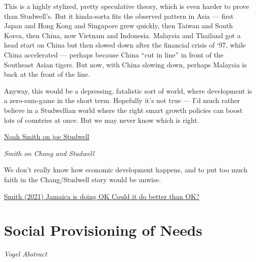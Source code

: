 \documentclass[
]{book}
\begin{document}
This is a highly stylized, pretty speculative theory, which is even harder to prove than Studwell's. But it kinda-sorta fits the observed pattern in Asia --- first Japan and Hong Kong and Singapore grew quickly, then Taiwan and South Korea, then China, now Vietnam and Indonesia. Malaysia and Thailand got a head start on China but then slowed down after the financial crisis of `97, while China accelerated --- perhaps because China ``cut in line'' in front of the Southeast Asian tigers. But now, with China slowing down, perhaps Malaysia is back at the front of the line.

Anyway, this would be a depressing, fatalistic sort of world, where development is a zero-sum-game in the short term. Hopefully it's not true --- I'd much rather believe in a Studwellian world where the right smart growth policies can boost lots of countries at once. But we may never know which is right.

\href{https://noahpinion.substack.com/p/what-studwell-got-wrong}{Noah Smith on joe Studwell}

\emph{Smith on Chang and Studwell}

We don't really know how economic development happens, and to put too much faith in the Chang/Studwell story would be unwise.

\href{https://noahpinion.subst\%20ack.com/p/jamaica-is-doing-ok}{Smith (2021) Jamaica is doing OK Could it do better than OK?}

\hypertarget{social-provisioning-of-needs}{%
\section{Social Provisioning of Needs}\label{social-provisioning-of-needs}}

\emph{Vogel Abstract}
\end{document}
